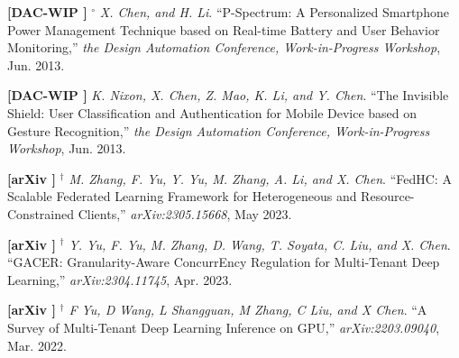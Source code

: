 	\textbf{[DAC-WIP ]}
	$^\circ$
	\textsl{X. Chen, and H. Li}.
		``P-Spectrum\@: A Personalized Smartphone Power Management Technique based on Real-time Battery and User Behavior Monitoring,''
		\textsl{the Design Automation Conference, Work-in-Progress Workshop}, Jun. 2013.
			\vspace{-3mm}

	\textbf{[DAC-WIP ]}\hspace{2mm}
	\textsl{K. Nixon, X. Chen, Z. Mao, K. Li, and Y. Chen}.
		``The Invisible Shield\@: User Classification and Authentication for Mobile Device based on Gesture Recognition,''
		\textsl{the Design Automation Conference, Work-in-Progress Workshop}, Jun. 2013.
			\vspace{-3mm}

			\vspace{3mm}








	\textbf{[arXiv ]}
	$^\dagger$
	\textsl{M. Zhang, F. Yu, Y. Yu, M. Zhang, A. Li, and X. Chen}.
		``FedHC: A Scalable Federated Learning Framework for Heterogeneous and Resource-Constrained Clients,''
		\textsl{arXiv:2305.15668}, May 2023.
			\vspace{-3mm}

	\textbf{[arXiv ]}
	$^\dagger$
	\textsl{Y. Yu, F. Yu, M. Zhang, D. Wang, T. Soyata, C. Liu, and X. Chen}.
		``GACER: Granularity-Aware ConcurrEncy Regulation for Multi-Tenant Deep Learning,''
		\textsl{arXiv:2304.11745}, Apr. 2023.
			\vspace{-3mm}

	\textbf{[arXiv ]}
	$^\dagger$
	\textsl{F Yu, D Wang, L Shangguan, M Zhang, C Liu, and X Chen}.
		``A Survey of Multi-Tenant Deep Learning Inference on GPU,''
		\textsl{arXiv:2203.09040}, Mar. 2022.
			\vspace{-3mm}

